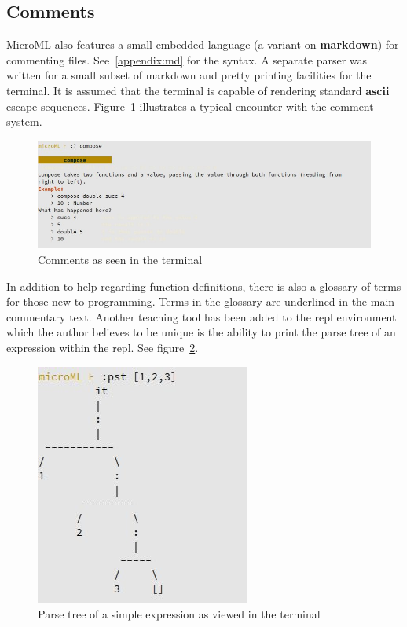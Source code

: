 \documentclass[12pt, a4paper]{report}
\begin{document}
\subsection{Comments}
MicroML also features a small embedded language (a variant on \textbf{markdown}) for commenting
files. See~\ref{appendix:md} for the syntax. A separate parser was written 
for a small subset of markdown and pretty printing facilities
for the terminal. It is assumed that the terminal is capable of rendering standard \textbf{ascii}
escape sequences. Figure~\ref{fig:comments} illustrates a typical encounter with the comment system.

\begin{figure}
    \includegraphics[width=\textwidth]{images/comment.jpg}
    {\caption{Comments as seen in the terminal}}
    \label{fig:comments}
\end{figure}

In addition to help regarding function definitions, there is also a glossary of terms for those new
to programming. Terms in the glossary are underlined in the main commentary text.  Another teaching 
tool has been added to the repl environment which the author believes to be unique
is the ability to print the parse tree of an expression within the repl. See figure~\ref{fig:tree}.

\begin{figure}
    \label{fig:tree}
    \includegraphics[scale=0.6]{images/tree.jpg}
    {\caption{Parse tree of a simple expression as viewed in the terminal}}
\end{figure}
\end{document}
